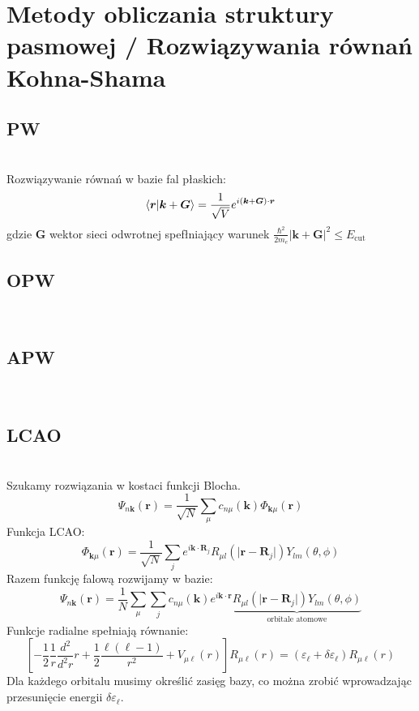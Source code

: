 \section{Metody obliczania struktury pasmowej / Rozwiązywania równań Kohna-Shama}


\subsection{PW}
~\\
Rozwiązywanie równań w bazie fal płaskich:
\begin{equation}
\bra{\boldsymbol{r}}\ket{\boldsymbol{k}+\boldsymbol{G}} =
\frac{1}{\sqrt{V}} e^{i\left(\boldsymbol{k}+\boldsymbol{G}\right) \cdot \boldsymbol{r}}
\end{equation}
gdzie $\boldsymbol{G}$ wektor sieci odwrotnej spefłniający warunek $\frac{\hbar^2}{2m_e}\vert\boldsymbol{k}+\boldsymbol{G}\vert^2 \leq E_{\text{cut}}$
\subsection{OPW}
~\\


\subsection{APW}
~\\


\subsection{LCAO}
~\\
Szukamy rozwiązania w kostaci funkcji Blocha.
$$
\Psi_{n\boldsymbol{k}}\left(\boldsymbol{r}\right) = 
\frac{1}{\sqrt{N}} \sum_{\mu} c_{n\mu}\left(\boldsymbol{k}\right) \Phi_{\boldsymbol{k}\mu}\left(\boldsymbol{r}\right)
$$
Funkcja LCAO:
$$
\Phi_{\boldsymbol{k}\mu}\left(\boldsymbol{r}\right) = \frac{1}{\sqrt{N}} \sum_j e^{i\boldsymbol{k}\cdot\boldsymbol{R}_j} R_{\mu l}(\vert\boldsymbol{r}-\boldsymbol{R}_j\vert) Y_{lm}\left(\theta,\phi\right)
$$
Razem funkcję falową rozwijamy w bazie:
$$
\Psi_{n\boldsymbol{k}}\left(\boldsymbol{r}\right) = \frac{1}{N} \sum_{\mu} \sum_{j}
c_{n\mu}\left(\boldsymbol{k}\right) e^{i\boldsymbol{k}\cdot\boldsymbol{r}}
\underset{\text{orbitale atomowe}}{\underbrace{
		R_{\mu l}(\vert\boldsymbol{r}-\boldsymbol{R}_j\vert) Y_{lm}\left(\theta,\phi\right)
}}
$$
Funkcje radialne spełniają równanie:
$$
\left[ -\frac{1}{2} \frac{1}{r} \frac{d^2}{d^2r} r + \frac{1}{2} \frac{\ell(\ell-1)}{r^2} + V_{\mu\ell}(r)\right] R_{\mu \ell}(r) = \left(\varepsilon_{\ell} + \delta \varepsilon_{\ell}\right) R_{\mu \ell}(r)
$$
Dla każdego orbitalu musimy określić zasięg bazy, co można zrobić wprowadzając przesunięcie energii $\delta \varepsilon_{\ell}$.


